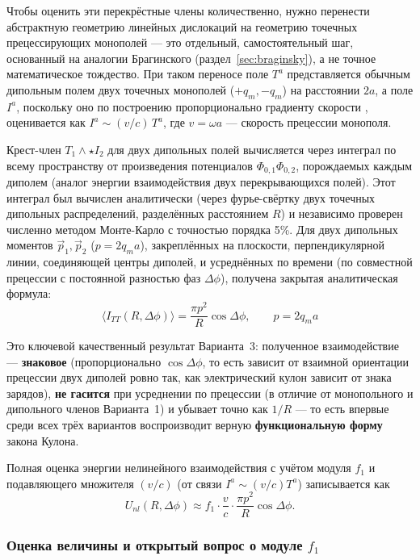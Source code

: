 \documentclass[12pt,a4paper]{article}
\begin{document}
Чтобы оценить эти перекрёстные члены количественно, нужно перенести
абстрактную геометрию линейных дислокаций на геометрию точечных
прецессирующих монополей --- это отдельный, самостоятельный шаг,
основанный на аналогии Брагинского (раздел~\ref{sec:braginsky}), а не
точное математическое тождество. При таком переносе поле $T^a$
представляется обычным дипольным полем двух точечных монополей
($+q_m,-q_m$) на расстоянии $2a$, а поле $I^a$, поскольку оно по
построению пропорционально градиенту скорости \cite{Lazar2010},
оценивается как $I^a\sim(v/c)\,T^a$, где $v=\omega a$ --- скорость
прецессии монополя.

Крест-член $T_1\wedge\star I_2$ для двух дипольных полей вычисляется
через интеграл по всему пространству от произведения потенциалов
$\Phi_{0,1}\Phi_{0,2}$, порождаемых каждым диполем (аналог энергии
взаимодействия двух перекрывающихся полей). Этот интеграл был вычислен
аналитически (через фурье-свёртку двух точечных дипольных распределений,
разделённых расстоянием $R$) и независимо проверен численно методом
Монте-Карло с точностью порядка 5\%. Для двух дипольных моментов
$\vec p_1,\vec p_2$ ($p=2q_ma$), закреплённых на плоскости, перпендикулярной
линии, соединяющей центры диполей, и усреднённых по времени (по
совместной прецессии с постоянной разностью фаз $\Delta\phi$), получена
закрытая аналитическая формула:
\begin{equation}
\boxed{\ \langle I_{TT}(R,\Delta\phi)\rangle
= \frac{\pi p^2}{R}\cos\Delta\phi,\qquad p=2q_m a\ }
\end{equation}

Это ключевой качественный результат Варианта~3: полученное
взаимодействие --- \textbf{знаковое} (пропорционально
$\cos\Delta\phi$, то есть зависит от взаимной ориентации прецессии
двух диполей ровно так, как электрический кулон зависит от знака
зарядов), \textbf{не гасится} при усреднении по прецессии (в отличие от
монопольного и дипольного членов Варианта~1) и убывает точно как
$1/R$ --- то есть впервые среди всех трёх вариантов воспроизводит
верную \textbf{функциональную форму} закона Кулона.

Полная оценка энергии нелинейного взаимодействия с учётом модуля
$f_1$ и подавляющего множителя $(v/c)$ (от связи $I^a\sim(v/c)T^a$)
записывается как
\begin{equation}
U_{nl}(R,\Delta\phi) \approx f_1\cdot\frac{v}{c}\cdot\frac{\pi p^2}{R}\cos\Delta\phi.
\end{equation}

\subsubsection{Оценка величины и открытый вопрос о модуле $f_1$}
\end{document}
